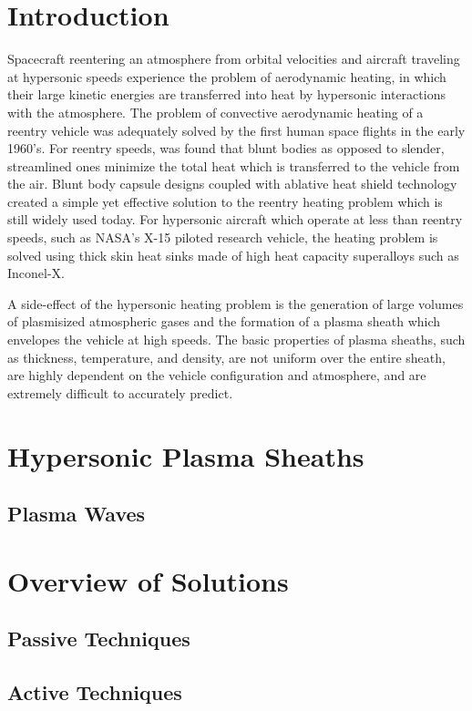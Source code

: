 \documentclass[twocolumn]{article}
\begin{document}
\section{Introduction}
	Spacecraft reentering an atmosphere from orbital velocities and aircraft traveling at hypersonic speeds experience the problem of aerodynamic heating, in which their large kinetic energies are transferred into heat by hypersonic interactions with the atmosphere.
	The problem of convective aerodynamic heating of a reentry vehicle was adequately solved by the first human space flights in the early 1960's.
	For reentry speeds, was found that blunt bodies as opposed to slender, streamlined ones minimize the total heat which is transferred to the vehicle from the air. \cite{allen_study_1958}
	Blunt body capsule designs coupled with ablative heat shield technology created a simple yet effective solution to the reentry heating problem which is still widely used today.
	For hypersonic aircraft which operate at less than reentry speeds, such as NASA's X-15 piloted research vehicle, the heating problem is solved using thick skin heat sinks made of high heat capacity superalloys such as Inconel-X. \cite{stillwell_x-15_1965}
	
	A side-effect of the hypersonic heating problem is the generation of large volumes of plasmisized atmospheric gases and the formation of a plasma sheath which envelopes the vehicle at high speeds.
	The basic properties of plasma sheaths, such as thickness, temperature, and density, are not uniform over the entire sheath, are highly dependent on the vehicle configuration and atmosphere, and are extremely difficult to accurately predict.
	
\section{Hypersonic Plasma Sheaths}

\subsection*{Plasma Waves}

\section{Overview of Solutions}
\subsection*{Passive Techniques}
\subsection*{Active Techniques}
\end{document}
